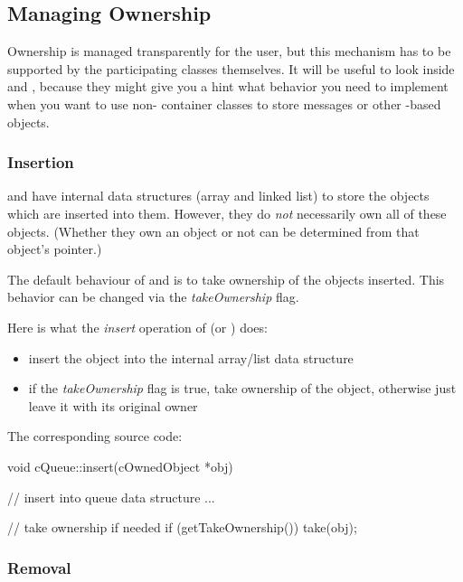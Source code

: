 \subsection{Managing Ownership}
\label{sec:sim-lib:managing-ownership}

Ownership is managed transparently for the user, but this mechanism
has to be supported by the participating classes themselves.
It will be useful to look inside  and ,
because they might give you a hint what behavior you need
to implement when you want to use non-{\opp} container classes
to store messages or other -based objects.


\subsubsection{Insertion}
\label{sec:sim-lib:ownership-and-insertion-into-container}

 and  have internal data structures
(array and linked list) to store the objects which are inserted
into them. However, they do \textit{not} necessarily own all of these
objects.  (Whether they own an object or not can be determined
from that object's  pointer.)

The default behaviour of  and  is
to take ownership of the objects inserted.
This behavior can be changed via the \textit{takeOwnership} flag.

Here is what the \textit{insert} operation of  (or ) does:
\begin{itemize}
    \item{insert the object into the internal array/list data structure}

    \item{if the \textit{takeOwnership} flag is true, take ownership
    of the object, otherwise just leave it with its original owner}
\end{itemize}

The corresponding source code:

\begin{cpp}
void cQueue::insert(cOwnedObject *obj)
{
    // insert into queue data structure
    ...

    // take ownership if needed
    if (getTakeOwnership())
        take(obj);

}
\end{cpp}


\subsubsection{Removal}
\label{sec:sim-lib:ownership-and-removal-from-container}

